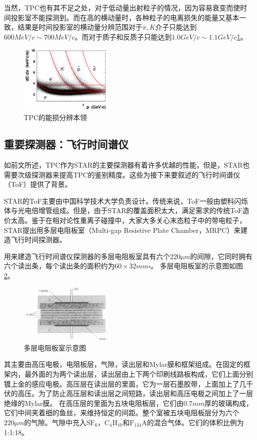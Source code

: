 \documentclass[%
 reprint,
 amsmath,amssymb,
 aps,
]{revtex4-1}
\begin{document}
当然，TPC也有其不足之处，对于低动量出射粒子的情况，因为容易衰变而使时间投影室不能探测到。而在高的横动量时，各种粒子的电离损失的能量又基本一致，结果是时间投影室的横动量分辨范围对于$\pi,K$介子只能达到 $600\si{MeV\per c}\sim700\si{MeV\per c}$。而对于质子和反质子只能达到$1.0\si{GeV\per c}\sim1.1\si{GeV\per c}$\ref{fig:dEdx}。
\begin{figure}[htbp]
    \includegraphics[width=0.4\textwidth]{Plots/dEdx.png}
    \caption{\label{fig:dEdx}TPC的能损分辨本领}
\end{figure}
\subsection{\label{sec:ToF}重要探测器：飞行时间谱仪}
如前文所述，TPC作为STAR的主要探测器有着许多优越的性能，但是，STAR也需要次级探测器来提高TPC的鉴别精度。这些为接下来要叙述的飞行时间谱仪（ToF）提供了背景。

STAR的ToF主要由中国科学技术大学负责设计\cite{Cheng}\cite{Ruan:2005hy}。传统来说，ToF一般由塑料闪烁体与光电倍增管组成。但是，由于STAR的覆盖面积太大，满足需求的传统ToF造价太高。鉴于在相对论性重离子碰撞中，大家大多关心末态粒子中的带电粒子，STAR提出用多层电阻板室（Multi-gap Resistive Plate Chamber，MRPC）来建造飞行时间探测器。

用来建造飞行时间谱仪探测器的多层电阻板室具有六个220$\si{\micro m}$的间隙，它同时拥有六个读出条，每个读出条的面积约为$60\times32\si{mm\square}$。 多层电阻板室的示意图如图\ref{fig:MRPC}。
\begin{figure}[htbp]
    \includegraphics[width=0.4\textwidth]{Plots/MRPC.png}
    \caption{\label{fig:MRPC}多层电阻板室示意图}
\end{figure}
其主要由高压电极，电阻板层，气隙，读出层和Mylar膜和框架组成。在固定的框架内，最外面的为两个读出层，读出层由上下两个印刷线路板构成，它们上面分别镀上金的感应电极。高压层在读出层的里面，它为一层石墨胶带，上面加上了几千伏的高压。为了防止高压层和读出层之间短路，读出层和高压电极之间加上了一层绝缘的Mylar膜。 在高压层的里面为五块电阻板层，它们由$0.7\si{mm}$厚的玻璃构成，它们中间夹着细的鱼丝，来维持恒定的间距。整个室被五块电阻板层分为六个$220\si{\micro m}$的气隙。气隙中充入$\text{SF}_6$，$\text{C}_4\text{H}_{10}$和$\text{F}_{134}\text{A}$的混合气体。它们的体积比例为1:1:18。
\end{document}
